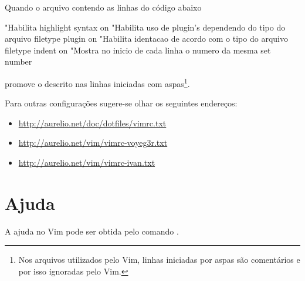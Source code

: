 Quando o arquivo  contendo as linhas do código abaixo
\begin{code}
    "Habilita highlight
    syntax on
    "Habilita uso de plugin's dependendo do tipo do arquivo
    filetype plugin on
    "Habilita identacao de acordo com o tipo do arquivo
    filetype indent on
    "Mostra no inicio de cada linha o numero da mesma
    set number
\end{code}
promove o descrito nas linhas iniciadas com aspas\footnote{Nos arquivos utilizados pelo Vim, linhas iniciadas por aspas são comentários e por isso ignoradas pelo Vim.}.

Para outras configurações sugere-se olhar os seguintes endereços:
\begin{itemize}
    \item \url{http://aurelio.net/doc/dotfiles/vimrc.txt}
    \item \url{http://aurelio.net/vim/vimrc-voyeg3r.txt}
    \item \url{http://aurelio.net/vim/vimrc-ivan.txt}
\end{itemize}

\section{Ajuda}

A ajuda no Vim pode ser obtida pelo comando  .
